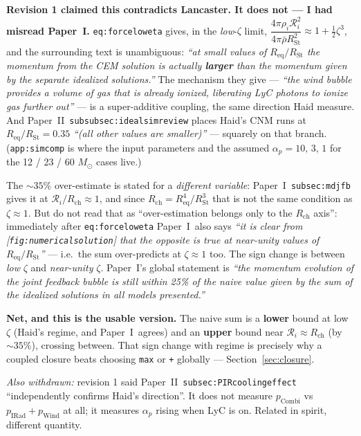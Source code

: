 \documentclass[11pt,a4paper,oneside]{report}
\newcommand{\brkus}{\textunderscore\allowbreak}
\newcommand{\code}[1]{\texttt{\small\let\_\brkus #1}}
\newcommand{\lbl}[1]{\texttt{\footnotesize\let\_\brkus #1}}
\newcommand{\PI}{Paper~I}
\newcommand{\PII}{Paper~II}
\newcommand{\Ri}{\mathcal{R}_{i}}
\newcommand{\Rch}{R_{\mathrm{ch}}}
\newcommand{\Req}{R_{\mathrm{eq}}}
\newcommand{\RSt}{R_{\mathrm{St}}}
\newcommand{\ap}{\alpha_p}
\newcommand{\rhobar}{\bar\rho}
\newcommand{\up}[1]{\textcolor{tqaccent}{\textbf{#1}}}
\begin{document}
\begin{keybox}
\textbf{\sffamily Revision 1 claimed this contradicts Lancaster. It does not --- I had
misread \PI.}
\lbl{eq:force\_low\_eta} gives, in the \emph{low}-$\zeta$ limit,
$\dfrac{4\pi\rho_i\Ri^2}{4\pi\rhobar\RSt^2}\approx1+\tfrac12\zeta^3$, and the
surrounding text is unambiguous: \emph{``at small values of $\Req/\RSt$ the momentum from
the CEM solution is actually \textbf{larger} than the momentum given by the separate
idealized solutions.''} The mechanism they give --- \emph{``the wind bubble provides a
volume of gas that is already ionized, liberating LyC photons to ionize gas further out''}
--- is a super-additive coupling, the same direction Haid measure. And \PII\
\lbl{subsubsec:ideal\_sim\_review} places Haid's CNM runs at $\Req/\RSt = 0.35$ \emph{``(all other
values are smaller)''} --- squarely on that branch. (\lbl{app:sim\_comp} is where the input
parameters and the assumed $\ap = 10,\,3,\,1$ for the 12 / 23 / 60 $M_\odot$ cases live.)
\end{keybox}

The ${\sim}35\%$ over-estimate is stated for a \emph{different variable}: \PI\
\lbl{subsec:md\_jfb} gives it at $\Ri/\Rch\approx1$, and since $\Rch=\Req^4/\RSt^3$ that is not the
same condition as $\zeta\approx1$. But do not read that as ``over-estimation belongs only to the
$\Rch$ axis'': immediately after \lbl{eq:force\_low\_eta} \PI\ also says \emph{``it is clear from
[\lbl{fig:numerical\_solution}] that the opposite is true at near-unity values of $\Req/\RSt$''}
--- i.e.\ the sum over-predicts at $\zeta\approx1$ too. The sign change is between \emph{low} $\zeta$
and \emph{near-unity} $\zeta$. \PI's global statement is \emph{``the momentum evolution of the joint
feedback bubble is still within 25\% of the naive value given by the sum of the idealized solutions
in all models presented.''}

\begin{keybox}
\textbf{\sffamily Net, and this is the usable version.} The naive sum is a \up{lower} bound
at low $\zeta$ (Haid's regime, and \PI\ agrees) and an \up{upper} bound near
$\Ri\approx\Rch$ (by ${\sim}35\%$), crossing between. That sign change with regime is
precisely why a coupled closure beats choosing \code{max} or \code{+} globally ---
Section~\ref{sec:closure}.
\end{keybox}

\emph{Also withdrawn:} revision 1 said \PII\ \lbl{subsec:PIR\_cooling\_effect}
``independently confirms Haid's direction''. It does not measure $p_{\mathrm{Combi}}$ vs
$p_{\mathrm{IRad}}+p_{\mathrm{Wind}}$ at all; it measures $\ap$ rising when LyC is on.
Related in spirit, different quantity.
\end{document}

